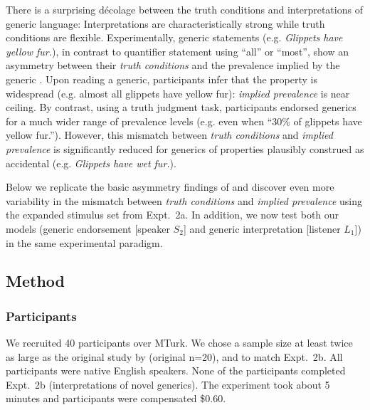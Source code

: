 \documentclass[12pt,letterpaper]{article}
\begin{document}
There is a surprising d\'{e}colage between the truth conditions and interpretations of generic language: Interpretations are characteristically strong while truth conditions are flexible. 
Experimentally, generic statements (e.g. \emph{Glippets have yellow fur.}), in contrast to quantifier statement using ``all'' or ``most'', show an asymmetry between their \emph{truth conditions} and the prevalence implied by the generic \cite{Cimpian2010}. 
Upon reading a generic, participants infer that the property is widespread (e.g. almost all glippets have yellow fur): \emph{implied prevalence} is near ceiling.
By contrast, using a truth judgment task, participants endorsed generics for a much wider range of prevalence levels (e.g. even when ``30\% of glippets have yellow fur.''). 
However, this mismatch between \emph{truth conditions} and \emph{implied prevalence} is significantly reduced for generics of properties plausibly construed as accidental (e.g. \emph{Glippets have wet fur.}).


Below we replicate the basic asymmetry findings of  and discover even more variability in the mismatch between \emph{truth conditions} and \emph{implied prevalence} using the expanded stimulus set from Expt.~2a.
In addition, we now test both our models (generic endorsement [speaker $S_2$] and generic interpretation [listener $L_1$]) in the same experimental paradigm. %


\subsection*{Method}
\subsubsection*{Participants}

We recruited 40 participants over MTurk.  
We chose a sample size at least twice as large as the original study by  (original n=20), and to match Expt.~2b. 
All participants were native English speakers. 
None of the participants completed Expt.~2b (interpretations of novel generics).
The experiment took about 5 minutes and participants were compensated \$0.60.
\end{document}
